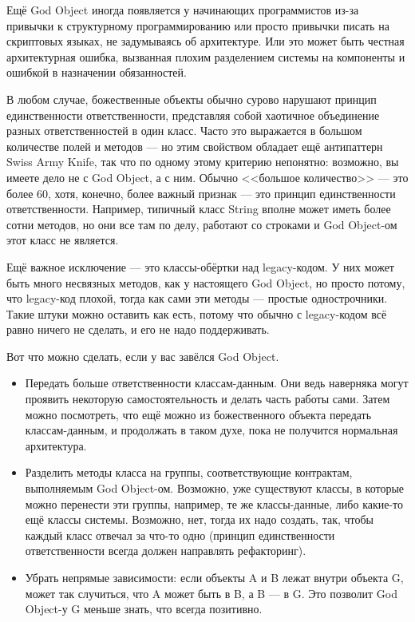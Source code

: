 \documentclass{../../text-style}
\begin{document}
Ещё God Object иногда появляется у начинающих программистов из-за привычки к структурному программированию или просто привычки писать на скриптовых языках, не задумываясь об архитектуре. Или это может быть честная архитектурная ошибка, вызванная плохим разделением системы на компоненты и ошибкой в назначении обязанностей.

В любом случае, божественные объекты обычно сурово нарушают принцип единственности ответственности, представляя собой хаотичное объединение разных ответственностей в один класс. Часто это выражается в большом количестве полей и методов --- но этим свойством обладает ещё антипаттерн Swiss Army Knife, так что по одному этому критерию непонятно: возможно, вы имеете дело не с God Object, а с ним. Обычно <<большое количество>> --- это более 60, хотя, конечно, более важный признак --- это принцип единственности ответственности. Например, типичный класс String вполне может иметь более сотни методов, но они все там по делу, работают со строками и God Object-ом этот класс не является.

Ещё важное исключение --- это классы-обёртки над legacy-кодом. У них может быть много несвязных методов, как у настоящего God Object, но просто потому, что legacy-код плохой, тогда как сами эти методы --- простые однострочники. Такие штуки можно оставить как есть, потому что обычно с legacy-кодом всё равно ничего не сделать, и его не надо поддерживать.

Вот что можно сделать, если у вас завёлся God Object.

\begin{itemize}
    \item Передать больше ответственности классам-данным. Они ведь наверняка могут проявить некоторую самостоятельность и делать часть работы сами. Затем можно посмотреть, что ещё можно из божественного объекта передать классам-данным, и продолжать в таком духе, пока не получится нормальная архитектура.
    \item Разделить методы класса на группы, соответствующие контрактам, выполняемым God Object-ом. Возможно, уже существуют классы, в которые можно перенести эти группы, например, те же классы-данные, либо какие-то ещё классы системы. Возможно, нет, тогда их надо создать, так, чтобы каждый класс отвечал за что-то одно (принцип единственности ответственности всегда должен направлять рефакторинг).
    \item Убрать непрямые зависимости: если объекты A и B лежат внутри объекта G, может так случиться, что A может быть в B, а B --- в G. Это позволит God Object-у G меньше знать, что всегда позитивно.
\end{itemize}
\end{document}
